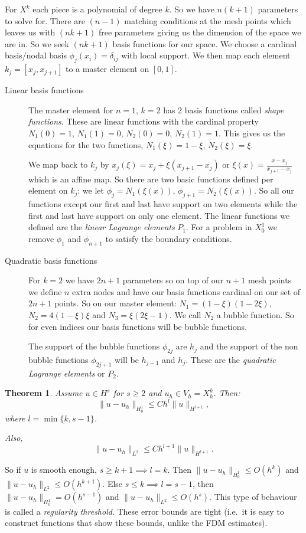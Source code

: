 \documentclass[12pt, a4paper]{article}
\newtheorem{thm}{Theorem}[section]
\theoremstyle{definition}
\theoremstyle{remark}
\numberwithin{equation}{section}
\begin{document}
For $X^k$ each piece is a polynomial of degree $k$. So we have $n(k+1)$ parameters to solve for. There are $(n-1)$ matching conditions at the mesh points which leaves us with $(nk+1)$ free parameters giving us the dimension of the space we are in. So we seek $(nk+1)$ basis functions for our space.
We choose a cardinal basis/nodal basis $\phi_j(x_i)=\delta_{ij}$ with local support.
We then map each element $k_j=[x_j,x_{j+1}]$ to a master element on $[0,1]$.
\begin{description}
\item [Linear basis functions]
The master element for $n=1$, $k=2$ has 2 basis functions called \emph{shape functions}.
These are linear functions with the cardinal property $N_1(0)=1$, $N_1(1)=0$, $N_2(0)=0$, $N_2(1)=1$. This gives us the equations for the two functions, $N_1(\xi)=1-\xi$, $N_2(\xi)=\xi$.

We map back to $k_j$ by $x_j(\xi)=x_j+\xi(x_{j+1}-x_j)$ or $\xi(x)=\frac{x-x_j}{x_{j+1}-x_j}$ which is an affine map.
So there are two basic functions defined per element on $k_j$: we let $\phi_j=N_1(\xi(x))$, $\phi_{j+1}=N_2(\xi(x))$. So all our functions except our first and last have support on two elements while the first and last have support on only one element.
The linear functions we defined are the \emph{linear Lagrange elements} $P_1$.
For a problem in $X_0^1$ we remove $\phi_1$ and $\phi_{n+1}$ to satisfy the boundary conditions.

\item [Quadratic basis functions]
For $k=2$ we have $2n+1$ parameters so on top of our $n+1$ mesh points we define $n$ extra nodes and have our basis functions cardinal on our set of $2n+1$ points.
So on our master element: $N_1=(1-\xi)(1-2\xi)$, $N_2=4(1-\xi)\xi$ and $N_3=\xi(2\xi-1)$. We call $N_2$ a bubble function. So for even indices our basis functions will be bubble functions.


The support of the bubble functions $\phi_{2j}$ are $h_j$ and the support of the non bubble functions $\phi_{2j+1}$ will be $h_{j-1}$ and $h_j$. These are the \emph{quadratic Lagrange elements} or $P_2$.
\end{description}

\begin{thm}
Assume $u \in H^s$ for $s \ge 2$ and $u_h \in V_h=X_h^k$. Then:
\begin{equation*}
\|u-u_h\|_{H_0^1} \le C h^l \|u\|_{H^{l+1}},
\end{equation*}
where $l=\min\{k,s-1\}$.

Also,
\begin{equation*}
\|u-u_h\|_{L^2} \le C h^{l+1}\|u\|_{H^{l+1}}.
\end{equation*}
\end{thm}
So if $u$ is smooth enough, $s \ge k+1 \implies l=k$. Then \mbox{$\|u-u_h\|_{H_0^1} \le O(h^k)$} and \mbox{$\|u-u_h\|_{L^2} \le O(h^{k+1})$}.
Else $s \le k \implies l=s-1$, then \mbox{$\|u-u_h\|_{H_0^1} = O(h^{s-1})$} and $\|u-u_h\|_{L^2} \le O(h^{s})$. This type of behaviour is called a \emph{regularity threshold}.
These error bounds are tight (i.e.\ it is easy to construct functions that show these bounds, unlike the FDM estimates).
\end{document}
